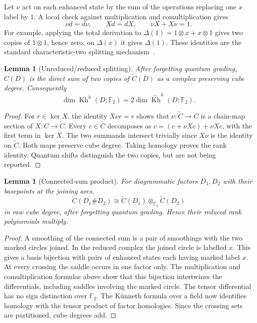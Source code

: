 \documentclass[11pt,letterpaper]{article}
\newtheorem{lemma}[theorem]{Lemma}
\theoremstyle{definition}\newtheorem{definition}[theorem]{Definition}
\theoremstyle{remark}\newtheorem{remark}[theorem]{Remark}
\newcommand{\F}{\mathbb F}
\newcommand{\Kh}{\operatorname{Kh}}
\newcommand{\rKh}{\widetilde{\operatorname{Kh}}}
\begin{document}
Let $\nu$ act on each enhanced state by the sum of the operations replacing one
$x$ label by $1$. A local check against multiplication and comultiplication
gives
\[
 \nu d=d\nu,\qquad Xd=dX,\qquad \nu X+X\nu=1.
\]
For example, applying the total derivation to
$\Delta(1)=1\otimes x+x\otimes1$ gives two copies of $1\otimes1$, hence zero;
on $\Delta(x)$ it gives $\Delta(1)$. These identities are the standard
characteristic-two splitting mechanism~\cite[Section~3.2]{shumakovitch}.

\begin{lemma}[Unreduced/reduced splitting]
After forgetting quantum grading, $C(D)$ is the direct sum of two copies of
$\widetilde C(D)$ as a complex preserving cube degree. Consequently
\[
 \dim\Kh^h(D;\F_2)=2\dim\rKh^h(D;\F_2).
\]
\end{lemma}
\begin{proof}
For $r\in\ker X$, the identity $X\nu r=r$ shows that
$\nu:\widetilde C\to C$ is a chain-map section of $X:C\to\widetilde C$.
Every $c\in C$ decomposes as
$c=(c+\nu Xc)+\nu Xc$, with the first term in $\ker X$.
The two summands intersect trivially since $X\nu$ is the identity on
$\widetilde C$. Both maps preserve cube degree. Taking homology proves the rank
identity. Quantum shifts distinguish the two copies, but are not being reported.
\end{proof}

\begin{lemma}[Connected-sum product]
For diagrammatic factors $D_1,D_2$ with their basepoints at the joining arcs,
\[
 \widetilde C(D_1\#D_2)\cong
 \widetilde C(D_1)\otimes_{\F_2}\widetilde C(D_2)
\]
in raw cube degree, after forgetting quantum grading. Hence their reduced rank
polynomials multiply.
\end{lemma}
\begin{proof}
A smoothing of the connected sum is a pair of smoothings with the two marked
circles joined. In the reduced complex the joined circle is labelled $x$.
This gives a basis bijection with pairs of enhanced states each having marked
label $x$. At every crossing the saddle occurs in one factor only. The
multiplication and comultiplication formulas above show that this bijection
intertwines the differentials, including saddles involving the marked circle.
The tensor differential has no sign distinction over $\F_2$. The K\"unneth
formula over a field now identifies homology with the tensor product of factor
homologies. Since the crossing sets are partitioned, cube degrees add.
\end{proof}
\end{document}
